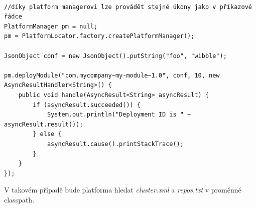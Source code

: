 \begin{lstlisting}[caption=Integrace do stávající Java aplikace]

//díky platform managerovi lze provádět stejné úkony jako v příkazové řádce
PlatformManager pm = null;
pm = PlatformLocator.factory.createPlatformManager();

JsonObject conf = new JsonObject().putString("foo", "wibble");

pm.deployModule("com.mycompany~my-module~1.0", conf, 10, new AsyncResultHandler<String>() {
    public void handle(AsyncResult<String> asyncResult) {
        if (asyncResult.succeeded()) {
            System.out.println("Deployment ID is " + asyncResult.result());
        } else {
            asyncResult.cause().printStackTrace();
        }
    }
});
\end{lstlisting}

V takovém případě bude platforma hledat \emph{cluster.xml} a \emph{repos.txt} v proměnné classpath.